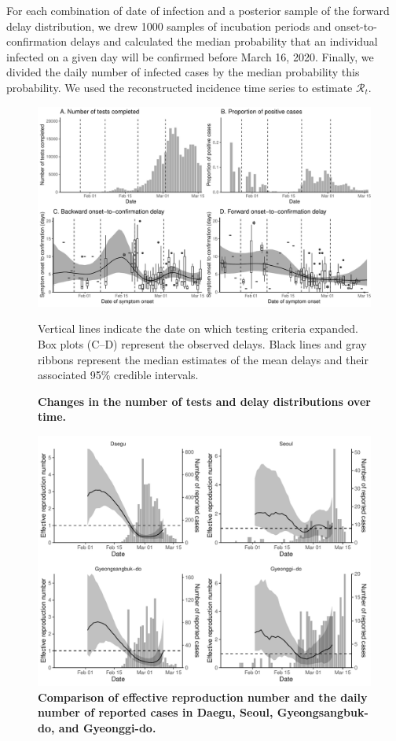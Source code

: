 For each combination of date of infection and a posterior sample of the forward delay distribution, we drew 1000 samples of incubation periods and onset-to-confirmation delays and calculated the median probability that an individual infected on a given day will be confirmed before March 16, 2020.
Finally, we divided the daily number of infected cases by the median probability this probability.
We used the reconstructed incidence time series to estimate $\mathcal R_t$.

\pagebreak

\begin{figure}[!ht]
\includegraphics[width=\textwidth]{figure_report_delay.pdf}
\caption{
\textbf{Changes in the number of tests and delay distributions over time.}
}
Vertical lines indicate the date on which testing criteria expanded.
Box plots (C--D) represent the observed delays.
Black lines and gray ribbons represent the median estimates of the mean delays and their associated 95\% credible intervals.
\end{figure}

\pagebreak

\begin{figure}[!ht]
\includegraphics[width=\textwidth]{figure_R_t_all.pdf}
\caption{
\textbf{Comparison of effective reproduction number and the daily number of reported cases in Daegu, Seoul, Gyeongsangbuk-do, and Gyeonggi-do.}
}
\end{figure}

